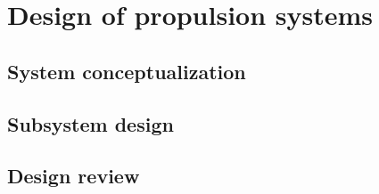 \chapter{Design of propulsion systems}
\section{System conceptualization}
\section{Subsystem design}
\section{Design review}